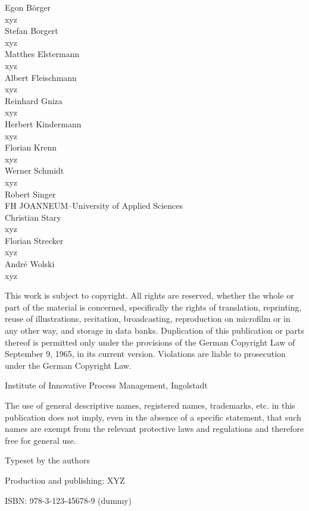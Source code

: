 \documentclass[11pt, showtrims, final]{memoir}
\begin{document}
\begingroup
\footnotesize
\setlength{\parindent}{0pt}
\setlength{\parskip}{\baselineskip}
\vspace*{3cm}
\begin{flushleft}
	Egon B\"orger\\
	xyz\\
	\medskip
	Stefan Borgert\\
	xyz\\
	\medskip
	Matthes Elstermann\\
	xyz\\
	\medskip
	Albert Fleischmann\\
	xyz\\
	\medskip
	Reinhard Gniza\\
	xyz\\
	\medskip
	Herbert Kindermann\\
	xyz\\
	\medskip
	Florian Krenn\\
	xyz\\
	\medskip
	Werner Schmidt\\
	xyz\\
	\medskip
	Robert Singer\\
	FH JOANNEUM--University of Applied Sciences\\
	\medskip
	Christian Stary\\
	xyz\\
	\medskip
	Florian Strecker\\
	xyz\\
	\medskip
	André Wolski\\
	xyz\\
\end{flushleft}
\vspace*{\fill}
This work is subject to copyright. All rights are reserved, whether the whole or part of the material is concerned, specifically the rights of translation, reprinting, reuse of illustrations, recitation, broadcasting, reproduction on microfilm or in any other way, and storage in data banks. Duplication of this publication or parts thereof is permitted only under the provisions of the German Copyright Law of September 9, 1965, in its current version. Violations
are liable to prosecution under the German Copyright Law.\par
{} Institute of Innovative Process Management, Ingolstadt\par
The use of general descriptive names, registered names, trademarks, etc. in this publication does not imply, even in the absence of a specific statement, that such names are exempt from the relevant protective laws and regulations and therefore free for general use.\par
Typeset by the authors\par
Production and publishing: XYZ\par
ISBN: 978-3-123-45678-9 (dummy)
\endgroup
\clearpage
\end{document}
